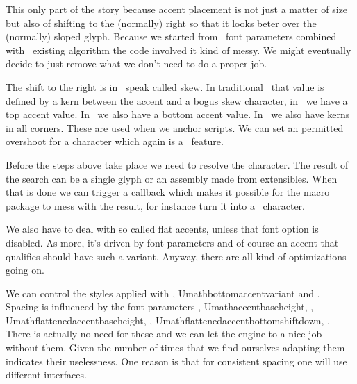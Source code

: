 \typebuffer[5][option=TEX]

\start \switchtobodyfont[pagella-nt] \getbuffer[5] \par \stop
\start \switchtobodyfont[pagella]    \getbuffer[5] \par \stop

This only part of the story because accent placement is not just a matter of size
but also of shifting to the (normally) right so that it looks beter over the
(normally) sloped glyph. Because we started from \OPENTYPE\ font parameters
combined with \TEX\ existing algorithm the code involved it kind of messy. We
might eventually decide to just remove what we don't need to do a proper job.

The shift to the right is in \TEX\ speak called skew. In traditional \TEX\ that
value is defined by a kern between the accent and a bogus skew character, in
\OPENTYPE\ we have a top accent value. In \LUAMETATEX\ we also have a bottom
accent value. In \LUAMETATEX\ we also have kerns in all corners. These are used
when we anchor scripts. We can set an permitted overshoot for a character which
again is a \LUAMETATEX\ feature.

Before the steps above take place we need to resolve the character. The result of
the search can be a single glyph or an assembly made from extensibles. When that
is done we can trigger a callback which makes it possible for the macro package
to mess with the result, for instance turn it into a \TYPETHREE\ character.

We also have to deal with so called flat accents, unless that font option is
disabled. As more, it's driven by font parameters and of course an accent that
qualifies should have such a variant. Anyway, there are all kind of optimizations
going on.

We can control the styles applied with , \prm
{Umathbottomaccentvariant} and . Spacing is
influenced by the font parameters , \prm
{Umathaccentbaseheight}, , \prm
{Umathflattenedaccentbaseheight}, , \prm
{Umathflattenedaccentbottomshiftdown}, . There
is actually no need for these and we can let the engine to a nice job without
them. Given the number of times that we find ourselves adapting them indicates
their uselessness. One reason is that for consistent spacing one will use
different interfaces.


